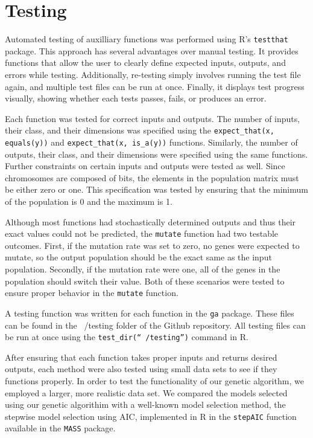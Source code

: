 \documentclass[11pt]{article}
\begin{document}
\section{Testing} 
\label{sec:testing}
Automated testing of auxilliary functions was performed using R's \texttt{testthat} package. This approach has several advantages over manual testing. It provides functions that allow the user to clearly define expected inputs, outputs, and errors while testing. Additionally, re-testing simply involves running the test file again, and multiple test files can be run at once. Finally, it displays test progress visually, showing whether each tests passes, fails, or produces an error.

Each function was tested for correct inputs and outputs. The number of
inputs, their class, and their dimensions was specified using the
\texttt{expect\_that(x, equals(y))} and \texttt{expect\_that(x,
  is\_a(y))} functions. Similarly, the number of outputs, their class,
and their dimensions were specified using the same
functions. Further constraints on certain inputs and outputs were tested as
well. Since chromosomes are composed of bits, the elements in the
population matrix must be either zero or one. This specification was
tested by ensuring that the minimum of the population is 0 and the
maximum is 1.

Although most functions had stochastically determined outputs and thus
their exact values could not be predicted, the \texttt{mutate}
function had two testable outcomes. First, if the mutation rate was
set to zero, no genes were expected to mutate, so the output
population should be the exact same as the input population. Secondly,
if the mutation rate were one, all of the genes in the population
should switch their value. Both of these scenarios were tested to
ensure proper behavior in the \texttt{mutate} function.

A testing function was written for each function in the \texttt{ga}
package. These files can be found in the ~/testing folder of the
Github repository. All testing files can be run at once using the
\texttt{test\_dir(``~/testing'')} command in R.

After ensuring that each function takes proper inputs and returns desired outputs,
each method were also tested using small data sets to see if they functions properly.
In order to test the functionality of our genetic algorithm, we employed a larger, more 
realistic data set. We compared the models selected using our genetic algorithim with a 
well-known model selection method, the stepwise model selection using AIC, 
implemented in R in the \texttt{stepAIC} function available in the 
\texttt{MASS} package.
\end{document}
